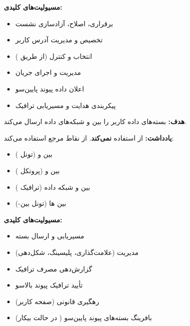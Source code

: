 \textbf{مسیولیت‌های کلیدی:}

\begin{itemize}
\tightlist
\item
  برقراری، اصلاح، آزادسازی نشست 
\item
  تخصیص و مدیریت آدرس  کاربر
\item
  انتخاب و کنترل  (از طریق )
\item
  مدیریت و اجرای جریان 
\item
  اعلان داده پیوند پایین‌سو
\item
  پیکربندی هدایت و مسیریابی ترافیک
\end{itemize}


\textbf{هدف:} بسته‌های داده کاربر را بین  و شبکه‌های داده ارسال می‌کند.

\textbf{\lr{\mbox{\CNwarn{}}} یادداشت:}  از  استفاده \textbf{نمی‌کند}. از نقاط مرجع استفاده می‌کند:

\begin{itemize}
\tightlist
\item
    بین  و  (تونل )
\item
    بین  و  (پروتکل )
\item
    بین  و شبکه داده (ترافیک )
\item
    بین ها (تونل  بین-)
\end{itemize}

\textbf{مسیولیت‌های کلیدی:}

\begin{itemize}
\tightlist
\item
  مسیریابی و ارسال بسته
\item
  مدیریت  (علامت‌گذاری، پلیسینگ، شکل‌دهی)
\item
  گزارش‌دهی مصرف ترافیک
\item
  تأیید ترافیک پیوند بالاسو
\item
  رهگیری قانونی (صفحه کاربر)
\item
  بافرینگ بسته‌های پیوند پایین‌سو ( در حالت بیکار)
\end{itemize}

